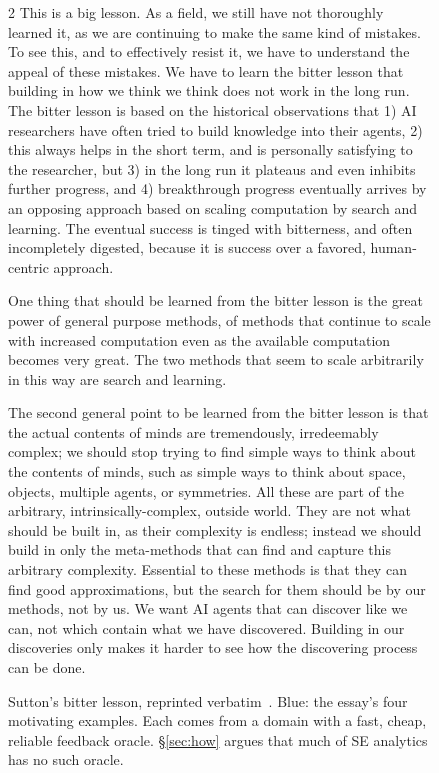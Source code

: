 \documentclass[10pt,conference]{IEEEtran}
\begin{document}
\begin{figure}[!t]
\begin{minipage}{0.94\textwidth}
\begin{multicols}{2}
This is a big lesson. As a field, we still have not thoroughly learned
it, as we are continuing to make the same kind of mistakes. To see
this, and to effectively resist it, we have to understand the appeal
of these mistakes. We have to learn the bitter lesson that building in
how we think we think does not work in the long run. The bitter lesson
is based on the historical observations that 1) AI researchers have
often tried to build knowledge into their agents, 2) this always helps
in the short term, and is personally satisfying to the researcher, but
3) in the long run it plateaus and even inhibits further progress, and
4) breakthrough progress eventually arrives by an opposing approach
based on scaling computation by search and learning. The eventual
success is tinged with bitterness, and often incompletely digested,
because it is success over a favored, human-centric approach.

One thing that should be learned from the bitter lesson is the great
power of general purpose methods, of methods that continue to scale
with increased computation even as the available computation becomes
very great. The two methods that seem to scale arbitrarily in this way
are search and learning.

The second general point to be learned from the bitter lesson is that
the actual contents of minds are tremendously, irredeemably complex;
we should stop trying to find simple ways to think about the contents
of minds, such as simple ways to think about space, objects, multiple
agents, or symmetries. All these are part of the arbitrary,
intrinsically-complex, outside world. They are not what should be
built in, as their complexity is endless; instead we should build in
only the meta-methods that can find and capture this arbitrary
complexity. Essential to these methods is that they can find good
approximations, but the search for them should be by our methods, not
by us. We want AI agents that can discover like we can, not which
contain what we have discovered. Building in our discoveries only
makes it harder to see how the discovering process can be done.
\end{multicols}
\end{minipage}
\caption{Sutton's bitter lesson, reprinted verbatim~\cite{sutton19}.
Blue: the essay's four motivating examples. Each comes from a domain
with a fast, cheap, reliable feedback oracle. \S\ref{sec:how} argues
that much of SE analytics has no such oracle.}
\label{fig:sutton}
\end{figure}
\end{document}
